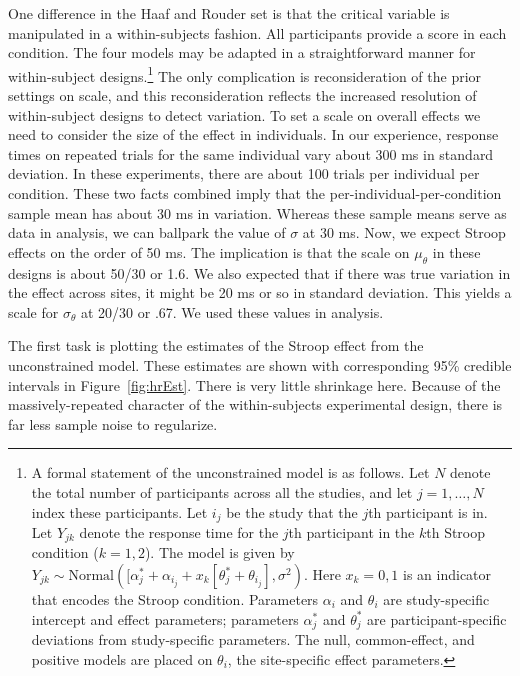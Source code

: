 \documentclass[english,man]{apa6}
\theoremstyle{definition}
\theoremstyle{definition}
\theoremstyle{definition}
\theoremstyle{remark}
\begin{document}
One difference in the Haaf and Rouder set is that the critical variable
is manipulated in a within-subjects fashion. All participants provide a
score in each condition. The four models may be adapted in a
straightforward manner for within-subject designs.\footnote{A formal
  statement of the unconstrained model is as follows. Let \(N\) denote
  the total number of participants across all the studies, and let
  \(j=1,\ldots,N\) index these participants. Let \(i_j\) be the study
  that the \(j\)th participant is in. Let \(Y_{jk}\) denote the response
  time for the \(j\)th participant in the \(k\)th Stroop condition
  (\(k=1,2\)). The model is given by
  \(Y_{jk}\sim \mbox{Normal}([\alpha^*_j+\alpha_{i_j}+x_k[\theta^*_j+\theta_{i_j}],\sigma^2)\).
  Here \(x_k=0,1\) is an indicator that encodes the Stroop condition.
  Parameters \(\alpha_i\) and \(\theta_i\) are study-specific intercept
  and effect parameters; parameters \(\alpha^*_j\) and \(\theta^*_j\)
  are participant-specific deviations from study-specific parameters.
  The null, common-effect, and positive models are placed on
  \(\theta_i\), the site-specific effect parameters.} The only
complication is reconsideration of the prior settings on scale, and this
reconsideration reflects the increased resolution of within-subject
designs to detect variation. To set a scale on overall effects we need
to consider the size of the effect in individuals. In our experience,
response times on repeated trials for the same individual vary about 300
ms in standard deviation. In these experiments, there are about 100
trials per individual per condition. These two facts combined imply that
the per-individual-per-condition sample mean has about 30 ms in
variation. Whereas these sample means serve as data in analysis, we can
ballpark the value of \(\sigma\) at 30 ms. Now, we expect Stroop effects
on the order of 50 ms. The implication is that the scale on
\(\mu_\theta\) in these designs is about 50/30 or 1.6. We also expected
that if there was true variation in the effect across sites, it might be
20 ms or so in standard deviation. This yields a scale for
\(\sigma_\theta\) at 20/30 or .67. We used these values in analysis.

The first task is plotting the estimates of the Stroop effect from the
unconstrained model. These estimates are shown with corresponding 95\%
credible intervals in Figure~\ref{fig:hrEst}. There is very little
shrinkage here. Because of the massively-repeated character of the
within-subjects experimental design, there is far less sample noise to
regularize.
\end{document}
